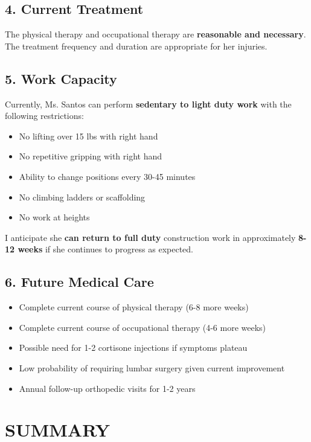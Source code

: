 \documentclass[11pt]{article}
\begin{document}
\subsection*{4. Current Treatment}

The physical therapy and occupational therapy are \textbf{reasonable and necessary}. The treatment frequency and duration are appropriate for her injuries.

\subsection*{5. Work Capacity}

Currently, Ms. Santos can perform \textbf{sedentary to light duty work} with the following restrictions:
\begin{itemize}[nosep]
\item No lifting over 15 lbs with right hand
\item No repetitive gripping with right hand
\item Ability to change positions every 30-45 minutes
\item No climbing ladders or scaffolding
\item No work at heights
\end{itemize}

I anticipate she \textbf{can return to full duty} construction work in approximately \textbf{8-12 weeks} if she continues to progress as expected.

\subsection*{6. Future Medical Care}

\begin{itemize}[nosep]
\item Complete current course of physical therapy (6-8 more weeks)
\item Complete current course of occupational therapy (4-6 more weeks)
\item Possible need for 1-2 cortisone injections if symptoms plateau
\item Low probability of requiring lumbar surgery given current improvement
\item Annual follow-up orthopedic visits for 1-2 years
\end{itemize}

\section*{SUMMARY}
\end{document}
